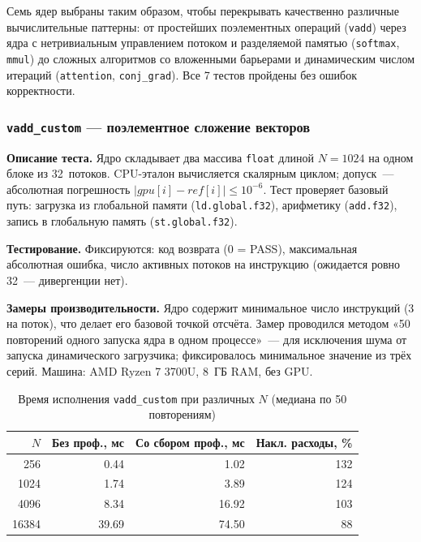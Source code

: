 Семь ядер выбраны таким образом, чтобы перекрывать качественно различные
вычислительные паттерны: от простейших поэлементных операций (\texttt{vadd})
через ядра с нетривиальным управлением потоком и разделяемой памятью
(\texttt{softmax}, \texttt{mmul}) до сложных алгоритмов со вложенными
барьерами и динамическим числом итераций (\texttt{attention}, \texttt{conj\_grad}).
Все 7 тестов пройдены без ошибок корректности.

\subsubsection{\texttt{vadd\_custom} --- поэлементное сложение векторов}

\textbf{Описание теста.}
Ядро складывает два массива \texttt{float} длиной $N=1024$ на одном
блоке из 32~потоков. CPU-эталон вычисляется скалярным циклом;
допуск~--- абсолютная погрешность $|gpu[i] - ref[i]| \leq 10^{-6}$.
Тест проверяет базовый путь: загрузка из глобальной памяти
(\texttt{ld.global.f32}), арифметику (\texttt{add.f32}),
запись в глобальную память (\texttt{st.global.f32}).

\textbf{Тестирование.}
Фиксируются: код возврата (0 = PASS), максимальная абсолютная
ошибка, число активных потоков на инструкцию
(ожидается ровно 32~--- дивергенции нет).

\textbf{Замеры производительности.}
Ядро содержит минимальное число инструкций (3 на поток),
что делает его базовой точкой отсчёта. Замер проводился
методом «50 повторений одного запуска ядра в одном процессе»~---
для исключения шума от запуска динамического загрузчика;
фиксировалось минимальное значение из трёх серий.
Машина: AMD Ryzen 7 3700U, 8~ГБ RAM, без GPU.

\begin{table}[h]
  \caption{Время исполнения \texttt{vadd\_custom} при различных $N$
           (медиана по 50 повторениям)}
  \label{tab:vadd_perf}
  \centering
  \begin{tabular}{rrrr}
    \toprule
    $N$ & Без проф., мс & Со сбором проф., мс & Накл. расходы, \% \\
    \midrule
    256   & 0.44 & 1.02 & 132 \\
    1024  & 1.74 & 3.89 & 124 \\
    4096  & 8.34 & 16.92 & 103 \\
    16384 & 39.69 & 74.50 & 88 \\
    \bottomrule
  \end{tabular}
\end{table}


